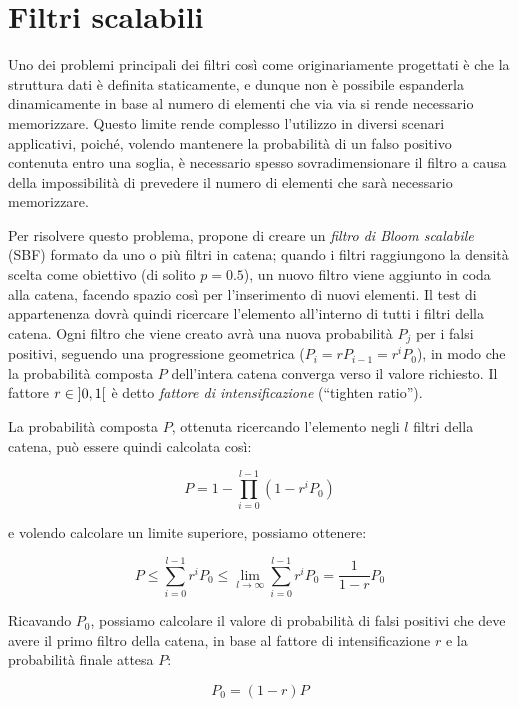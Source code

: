 \section{Filtri scalabili}
\label{sec:bloomscalable}

Uno dei problemi principali dei filtri così come originariamente progettati è che la struttura
dati è definita staticamente, e dunque non è possibile espanderla dinamicamente in base al
numero di elementi che via via si rende necessario memorizzare. Questo limite rende complesso
l'utilizzo in diversi scenari applicativi, poiché, volendo mantenere la probabilità di un falso
positivo contenuta entro una soglia, è necessario spesso sovradimensionare il filtro a causa della 
impossibilità di prevedere il numero di elementi che sarà necessario memorizzare.

Per risolvere questo problema, \cite{bloom-scalable} propone di creare un \emph{filtro di Bloom
scalabile} (SBF) formato da uno o più filtri in catena; quando i filtri raggiungono la densità
scelta come obiettivo (di solito $p=0.5$), un nuovo filtro viene aggiunto in coda alla catena,
facendo spazio così per l'inserimento di nuovi elementi. Il test di appartenenza dovrà quindi
ricercare l'elemento all'interno di tutti i filtri della catena. Ogni filtro che viene creato avrà
una nuova probabilità $P_j$ per i falsi positivi, seguendo una progressione geometrica ($P_i =
rP_{i-1} = r^iP_0$), in modo che la probabilità composta $P$ dell'intera catena converga verso il
valore richiesto. Il fattore $r \in \interval[open]{0}{1}$ è detto \emph{fattore di
intensificazione} (``tighten ratio'').

La probabilità composta $P$, ottenuta ricercando l'elemento negli $l$ filtri della catena, può
essere quindi calcolata così:

$$ P = 1 - \prod_{i=0}^{l-1}(1-r^iP_0) $$

e volendo calcolare un limite superiore, possiamo ottenere:

$$ P \leq \sum_{i=0}^{l-1} r^iP_0 \leq \lim_{l \rightarrow \infty} \sum_{i=0}^{l-1} r^iP_0 =
\frac{1}{1-r}P_0 $$

Ricavando $P_0$, possiamo calcolare il valore di probabilità di falsi positivi che deve avere
il primo filtro della catena, in base al fattore di intensificazione $r$ e la probabilità finale
attesa $P$:

\begin{equation} \label{eq:p0fromp}
P_0 = (1-r)P
\end{equation}


